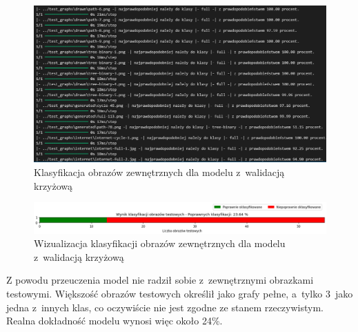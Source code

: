 \begin{figure}[ht]
	\centering
	\includegraphics[width=14cm]{resources/tests/images/v3/crossvalid_txt.png}
	\caption{Klasyfikacja obrazów zewnętrznych dla modelu z~walidacją krzyżową}
	\label{Fig:tests-cv-0b}
\end{figure}
\FloatBarrier

\begin{figure}[ht]
	\centering
	\includegraphics[width=14cm]{resources/tests/images/v3/crossvalid_bar.png}
	\caption{Wizualizacja klasyfikacji obrazów zewnętrznych dla modelu z~walidacją krzyżową}
	\label{Fig:tests-cv-0c}
\end{figure}
\FloatBarrier

Z powodu przeuczenia model nie radził sobie z~zewnętrznymi obrazkami testowymi.
Większość obrazów testowych określił jako grafy pełne, a~tylko 3~jako jedna z~innych klas,
co oczywiście nie jest zgodne ze stanem rzeczywistym.
Realna dokładność modelu wynosi więc około 24\%.

